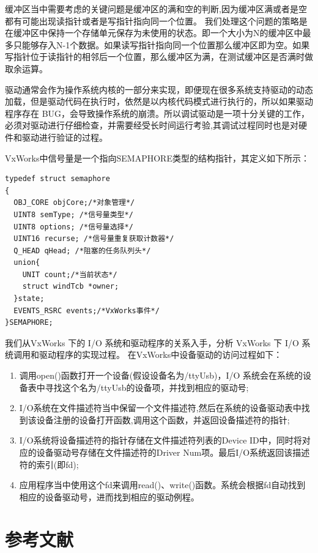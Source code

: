 缓冲区当中需要考虑的关键问题是缓冲区的满和空的判断,因为缓冲区满或者是空都有可能出现读指针或者是写指针指向同一个位置。 我们处理这个问题的策略是在缓冲区中保持一个存储单元保存为未使用的状态。即一个大小为N的缓冲区中最多只能够存入N-1个数据。如果读写指针指向同一个位置那么缓冲区即为空。如果写指针位于读指针的相邻后一个位置，那么缓冲区为满，在测试缓冲区是否满时做取余运算。

驱动通常会作为操作系统内核的一部分来实现，即便现在很多系统支持驱动的动态加载，但是驱动代码在执行时，依然是以内核代码模式进行执行的，所以如果驱动程序存在 BUG，会导致操作系统的崩溃。所以调试驱动是一项十分关键的工作，必须对驱动进行仔细检查，并需要经受长时间运行考验,其调试过程同时也是对硬件和驱动进行验证的过程。

VxWorks中信号量是一个指向SEMAPHORE类型的结构指针，其定义如下所示\cite{胡明民2012基于实时操作系统}：
\lstset{language=C}
\begin{lstlisting}
typedef struct semaphore
{
  OBJ_CORE objCore;/*对象管理*/
  UINT8 semType; /*信号量类型*/
  UINT8 options; /*信号量选择*/
  UINT16 recurse; /*信号量重复获取计数器*/
  Q_HEAD qHead; /*阻塞的任务队列头*/
  union{
	UNIT count;/*当前状态*/
	struct windTcb *owner;  
  }state;
  EVENTS_RSRC events;/*VxWorks事件*/
}SEMAPHORE;
\end{lstlisting}  




我们从VxWorks 下的 I/O 系统和驱动程序的关系入手，分析 VxWorks 下 I/O 系统调用和驱动程序的实现过程。
在VxWorks中设备驱动的访问过程如下：
\begin{enumerate}
\item 调用open()函数打开一个设备(假设设备名为/ttyUsb)，I/O 系统会在系统的设备表中寻找这个名为/ttyUsb的设备项，并找到相应的驱动号; 
\item I/O系统在文件描述符当中保留一个文件描述符,然后在系统的设备驱动表中找到该设备注册的设备打开函数,调用这个函数，并返回设备描述符的指针;
\item I/O系统将设备描述符的指针存储在文件描述符列表的Device ID中，同时将对应的设备驱动号存储在文件描述符的Driver Num项。最后I/O系统返回该描述符的索引(即fd);
\item 应用程序当中使用这个fd来调用read()、write()函数。系统会根据fd自动找到相应的设备驱动号，进而找到相应的驱动例程\cite{解月江2004VxWorks设备驱动技术研究}。 
\end{enumerate}








\section{参考文献}

